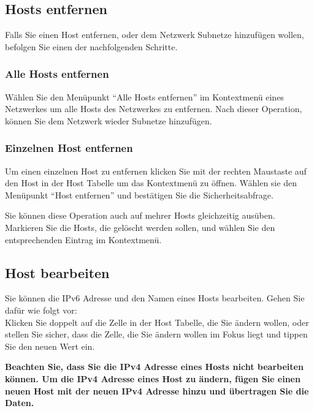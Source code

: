 \subsection{Hosts entfernen}
Falls Sie einen Host entfernen, oder dem Netzwerk Subnetze hinzufügen wollen,
befolgen Sie einen der nachfolgenden Schritte.

\subsubsection{Alle Hosts entfernen}
\label{AlleHostsEntfernen}
Wählen Sie den Menüpunkt "`Alle Hosts entfernen"' im Kontextmenü eines Netzwerkes
um alle Hosts des Netzwerkes zu entfernen. Nach dieser Operation, können Sie
dem Netzwerk wieder Subnetze hinzufügen.

\subsubsection{Einzelnen Host entfernen}
Um einen einzelnen Host zu entfernen klicken Sie mit der rechten Maustaste auf
den Host in der Host Tabelle um das Kontextmenü zu öffnen. Wählen sie den
Menüpunkt "`Host entfernen"' und bestätigen Sie die Sicherheitsabfrage.

Sie können diese Operation auch auf mehrer Hosts gleichzeitig ausüben. Markieren
Sie die Hosts, die gelöscht werden sollen, und wählen Sie den entsprechenden
Eintrag im Kontextmenü.

\subsection{Host bearbeiten}
\label{HostBearbeiten}
Sie können die IPv6 Adresse und den Namen eines Hosts bearbeiten. Gehen Sie
dafür wie folgt vor:\\
Klicken Sie doppelt auf die Zelle in der Host Tabelle, die
Sie ändern wollen, oder stellen Sie sicher, dass die Zelle, die Sie ändern
wollen im Fokus liegt und tippen Sie den neuen Wert ein.

\textbf{Beachten Sie, dass Sie die IPv4 Adresse eines Hosts nicht bearbeiten können.
Um die IPv4 Adresse eines Host zu ändern, fügen Sie einen neuen Host mit der
neuen IPv4 Adresse hinzu und übertragen Sie die Daten.}